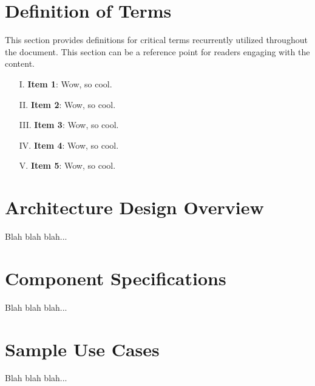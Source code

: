 \documentclass{article}
\begin{document}
\section{Definition of Terms}
This section provides definitions for critical terms recurrently utilized throughout the document. This section can be a reference point for readers engaging with the content.

\begin{enumerate}
    \item[I.] \textbf{Item 1}: Wow, so cool.
    \item[II.] \textbf{Item 2}: Wow, so cool.
    \item[III.] \textbf{Item 3}: Wow, so cool.
    \item[IV.] \textbf{Item 4}: Wow, so cool.
    \item[V.] \textbf{Item 5}: Wow, so cool.
\end{enumerate}

\section{Architecture Design Overview}
Blah blah blah...

\section{Component Specifications}
Blah blah blah...

\section{Sample Use Cases}
Blah blah blah...

\newpage

\printbibliography

{\parindent0pt}
\end{document}
